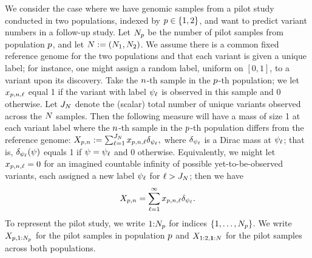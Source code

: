 
We consider the case where we have genomic samples from a pilot study conducted in two populations, indexed by $p \in \{1,2\}$,
and want to predict variant numbers in a follow-up study. 
Let $N_{p}$ be the number of pilot samples from population $p$, and let $\vecsamplesize := (\samplesize{1}, \samplesize{2})$.
We assume there is a common fixed reference genome for the two populations and that
each variant is given a unique label; for instance, one might assign a random label, uniform on $[0,1]$, to a variant upon its discovery.
Take the $n$-th sample in the $p$-th population; we let $x_{p,n,\ell}$ equal 1 if the variant with label 
$\psi_{\ell}$ is observed in this sample and 0 otherwise. Let $\genericnumvariants$ denote the (scalar) total number
of unique variants observed across the $\vecsamplesize$ samples. Then the following measure will have a mass
of size 1 at each variant label where the $n$-th sample in the $p$-th population differs from the reference genome:
$\genericmeasurevariantcount := \sum_{\variantidx=1}^{\genericnumvariants} \genericvariantcount \dirac{\genericvariantlabel},$
where $\delta_{\psi_{\ell}}$ is a Dirac mass at $\psi_{\ell}$; that is, $\delta_{\psi_{\ell}}(\psi_{})$ equals 1 if $\psi_{} = \psi_{\ell}$ and 0 otherwise. 
Equivalently, we might let $x_{p,n,\ell} = 0$ for an imagined countable infinity of possible yet-to-be-observed variants, each assigned a new label $\psi_{\ell}$ for $\variantidx > \genericnumvariants$; then we have
\begin{equation}
	X_{p,n} = \sum_{\ell=1}^{\infty} x_{p,n,\ell} \delta_{\psi_{\ell}}. \label{eq:observation_measure_inf}
\end{equation}
To represent the pilot study, we write $1{:}N_{p}$ for indices $\{1,\ldots,N_{p}\}$. We write
$X_{p,1:N_{p}}$ for the pilot samples in population $p$ and
$\pilotdata$ for the pilot samples across both populations.


